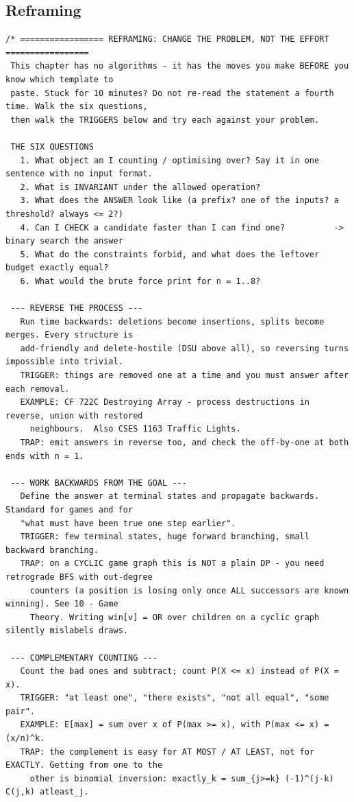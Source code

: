 \documentclass[9pt,a4paper,twocolumn]{extarticle}
\begin{document}
\subsection{Reframing}
\nopagebreak
\begin{lstlisting}
/* ================= REFRAMING: CHANGE THE PROBLEM, NOT THE EFFORT =================
 This chapter has no algorithms - it has the moves you make BEFORE you know which template to
 paste. Stuck for 10 minutes? Do not re-read the statement a fourth time. Walk the six questions,
 then walk the TRIGGERS below and try each against your problem.

 THE SIX QUESTIONS
   1. What object am I counting / optimising over? Say it in one sentence with no input format.
   2. What is INVARIANT under the allowed operation?
   3. What does the ANSWER look like (a prefix? one of the inputs? a threshold? always <= 2?)
   4. Can I CHECK a candidate faster than I can find one?          -> binary search the answer
   5. What do the constraints forbid, and what does the leftover budget exactly equal?
   6. What would the brute force print for n = 1..8?

 --- REVERSE THE PROCESS ---
   Run time backwards: deletions become insertions, splits become merges. Every structure is
   add-friendly and delete-hostile (DSU above all), so reversing turns impossible into trivial.
   TRIGGER: things are removed one at a time and you must answer after each removal.
   EXAMPLE: CF 722C Destroying Array - process destructions in reverse, union with restored
     neighbours.  Also CSES 1163 Traffic Lights.
   TRAP: emit answers in reverse too, and check the off-by-one at both ends with n = 1.

 --- WORK BACKWARDS FROM THE GOAL ---
   Define the answer at terminal states and propagate backwards. Standard for games and for
   "what must have been true one step earlier".
   TRIGGER: few terminal states, huge forward branching, small backward branching.
   TRAP: on a CYCLIC game graph this is NOT a plain DP - you need retrograde BFS with out-degree
     counters (a position is losing only once ALL successors are known winning). See 10 - Game
     Theory. Writing win[v] = OR over children on a cyclic graph silently mislabels draws.

 --- COMPLEMENTARY COUNTING ---
   Count the bad ones and subtract; count P(X <= x) instead of P(X = x).
   TRIGGER: "at least one", "there exists", "not all equal", "some pair".
   EXAMPLE: E[max] = sum over x of P(max >= x), with P(max <= x) = (x/n)^k.
   TRAP: the complement is easy for AT MOST / AT LEAST, not for EXACTLY. Getting from one to the
     other is binomial inversion: exactly_k = sum_{j>=k} (-1)^(j-k) C(j,k) atleast_j.


\end{lstlisting}
\end{document}
